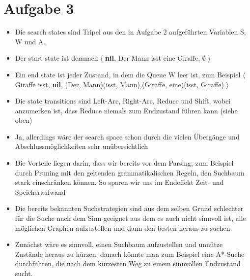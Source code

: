 \documentclass[a4paper,10pt]{article}
\begin{document}
\section*{Aufgabe 3}
\begin{itemize}
 \item Die search states sind Tripel aus den in Aufgabe 2 aufgeführten Variablen S, W und A.
 \item Der start state ist demnach $\langle$ \textbf{nil}, Der Mann isst eine Giraffe, $\emptyset$ $\rangle$
 \item Ein end state ist jeder Zustand, in dem die Queue W leer ist, zum Beispiel $\langle$ Giraffe isst, \textbf{nil}, {(Der, Mann)(isst, Mann),(Giraffe, eine)(isst, Giraffe)} $\rangle$
 \item Die state transitions sind Left-Arc, Right-Arc, Reduce und Shift, wobei anzumerken ist, dass Reduce niemals zum Endzustand führen kann (siehe oben)
 \item Ja, allerdings wäre der search space schon durch die vielen Übergänge und Abschlussmöglichkeiten sehr unübersichtlich
 \item Die Vorteile liegen darin, dass wir bereits vor dem Parsing, zum Beispiel durch Pruning mit den geltenden grammatikalischen Regeln, den Suchbaum stark einschränken können.
 So sparen wir uns im Endeffekt Zeit- und Speicheraufwand
 \item Die bereits bekannten Suchstrategien sind aus dem selben Grund schlechter für die Suche nach dem Sinn geeignet aus dem es auch nicht sinnvoll ist, alle möglichen Graphen 
 aufzustellen und dann den besten heraus zu suchen.
 \item Zunächst wäre es sinnvoll, einen Suchbaum aufzustellen und unnütze Zustände heraus zu kürzen, danach könnte man zum Beispiel eine A*-Suche durchführen, die nach dem kürzesten Weg
 zu einem sinnvollen Endzustand sucht.
\end{itemize}

 
\end{document}
